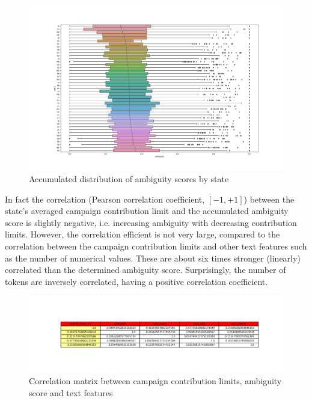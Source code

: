 \documentclass{custom_report}
\begin{document}
\begin{figure}[h!]
\begin{center}
\includegraphics[width=14cm]{images/uss_ambiguity_by_state.png}
\end{center}
\caption{Accumulated distribution of ambiguity scores by state}
\label{fig:uss_ambiguity_by_state}
\end{figure}


In fact the correlation (Pearson correlation coefficient, $[-1, +1]$) between the state's averaged campaign contribution limit and the accumulated ambiguity score is slightly negative, i.e. increasing ambiguity with decreasing contribution limits. However, the correlation efficient is not very large, compared to the correlation between the campaign contribution limits and other text features such as the number of numerical values. These are about six times stronger (linearly) correlated than the determined ambiguity score. Surprisingly, the number of tokens are inversely correlated, having a positive correlation coefficient. 

\begin{figure}[h!]
\begin{center}
\includegraphics[width=14cm]{images/correlation_table.png}
\end{center}
\caption{Correlation matrix between campaign contribution limits, ambiguity score and text features}
\label{fig:correlation_table}
\end{figure}
\end{document}
